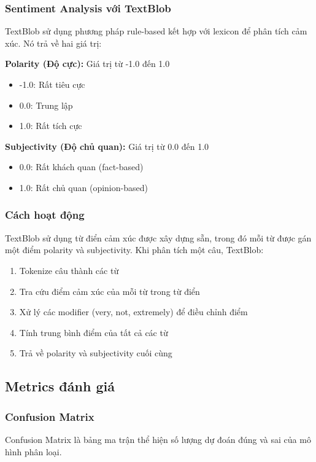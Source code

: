 \subsubsection{Sentiment Analysis với TextBlob}
TextBlob sử dụng phương pháp rule-based kết hợp với lexicon để phân tích cảm xúc. Nó trả về hai giá trị:

\textbf{Polarity (Độ cực):} Giá trị từ -1.0 đến 1.0
\begin{itemize}
    \item -1.0: Rất tiêu cực
    \item 0.0: Trung lập
    \item 1.0: Rất tích cực
\end{itemize}

\textbf{Subjectivity (Độ chủ quan):} Giá trị từ 0.0 đến 1.0
\begin{itemize}
    \item 0.0: Rất khách quan (fact-based)
    \item 1.0: Rất chủ quan (opinion-based)
\end{itemize}

\subsubsection{Cách hoạt động}
TextBlob sử dụng từ điển cảm xúc được xây dựng sẵn, trong đó mỗi từ được gán một điểm polarity và subjectivity. Khi phân tích một câu, TextBlob:
\begin{enumerate}
    \item Tokenize câu thành các từ
    \item Tra cứu điểm cảm xúc của mỗi từ trong từ điển
    \item Xử lý các modifier (very, not, extremely) để điều chỉnh điểm
    \item Tính trung bình điểm của tất cả các từ
    \item Trả về polarity và subjectivity cuối cùng
\end{enumerate}

\subsection{Metrics đánh giá}

\subsubsection{Confusion Matrix}
Confusion Matrix là bảng ma trận thể hiện số lượng dự đoán đúng và sai của mô hình phân loại.

